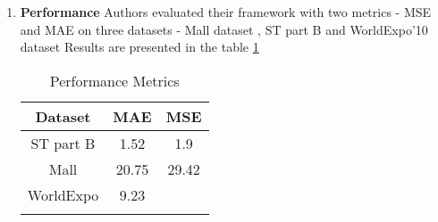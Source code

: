\begin{enumerate}
\begin{enumerate}
        \item \textbf{Performance}
        Authors evaluated their framework with two metrics - MSE and MAE on three datasets - Mall dataset \cite{chen2012mall}, ST part B \cite{7780439} and WorldExpo’10 dataset \cite{Zhang_2015_CVPR} 
        Results are presented in the table \ref{tab:decidenet}
        \begin{center}
            \begin{longtable}{ccc}
            \label{tab:decidenet} \\
            \hline
            Dataset & MAE &  MSE\\
            \hline
            ST part B & 1.52 & 1.9 \\
            Mall & 20.75 & 29.42\\
            WorldExpo & 9.23 & \\
            \hline
            \caption[Metrics table for DecideNet]{Performance Metrics} 
            \end{longtable}
        \end{center}
        

\end{enumerate}
\end{enumerate}
